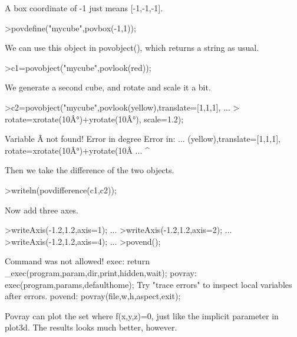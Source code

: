 \documentclass[a4paper,10pt]{article}
\begin{document}
\begin{eulernotebook}
\begin{eulercomment}
A box coordinate of -1 just means [-1,-1,-1].
\end{eulercomment}
\begin{eulerprompt}
>povdefine("mycube",povbox(-1,1));
\end{eulerprompt}
\begin{eulercomment}
We can use this object in povobject(), which returns a string as
usual.
\end{eulercomment}
\begin{eulerprompt}
>c1=povobject("mycube",povlook(red));
\end{eulerprompt}
\begin{eulercomment}
We generate a second cube, and rotate and scale it a bit.
\end{eulercomment}
\begin{eulerprompt}
>c2=povobject("mycube",povlook(yellow),translate=[1,1,1], ...
>  rotate=xrotate(10Â°)+yrotate(10Â°), scale=1.2);
\end{eulerprompt}
\begin{euleroutput}
  Variable Â not found!
  Error in degree
  Error in:
  ... (yellow),translate=[1,1,1],   rotate=xrotate(10Â°)+yrotate(10Â ...
                                                       ^
\end{euleroutput}
\begin{eulercomment}
Then we take the difference of the two objects.
\end{eulercomment}
\begin{eulerprompt}
>writeln(povdifference(c1,c2));
\end{eulerprompt}
\begin{eulercomment}
Now add three axes.
\end{eulercomment}
\begin{eulerprompt}
>writeAxis(-1.2,1.2,axis=1); ...
>writeAxis(-1.2,1.2,axis=2); ...
>writeAxis(-1.2,1.2,axis=4); ...
>povend();
\end{eulerprompt}
\begin{euleroutput}
  Command was not allowed!
  exec:
      return _exec(program,param,dir,print,hidden,wait);
  povray:
      exec(program,params,defaulthome);
  Try "trace errors" to inspect local variables after errors.
  povend:
      povray(file,w,h,aspect,exit); 
\end{euleroutput}
\begin{eulercomment}
Povray can plot the set where f(x,y,z)=0, just like the implicit parameter in plot3d. The results looks much better,
however.


\end{eulercomment}
\end{eulernotebook}
\end{document}
